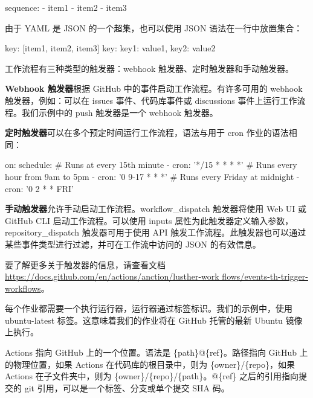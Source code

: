\begin{shell}
sequence:
  - item1
  - item2
  - item3
\end{shell}

由于 YAML 是 JSON 的一个超集，也可以使用 JSON 语法在一行中放置集合：

\begin{shell}
key: [item1, item2, item3]
key: {key1: value1, key2: value2}
\end{shell}


工作流程有三种类型的触发器：webhook 触发器、定时触发器和手动触发器。

\textbf{Webhook 触发器}根据 GitHub 中的事件启动工作流程。有许多可用的 webhook 触发器，例如：可以在 issues 事件、代码库事件或 discussions 事件上运行工作流程。我们示例中的 push 触发器是一个 webhook 触发器。

\textbf{定时触发器}可以在多个预定时间运行工作流程，语法与用于 cron 作业的语法相同：

\begin{shell}
on:
  schedule:
    # Runs at every 15th minute
    - cron: '*/15 * * * *'
    # Runs every hour from 9am to 5pm
    - cron: '0 9-17 * * *'
    # Runs every Friday at midnight
    - cron: '0 2 * * FRI'
\end{shell}

\textbf{手动触发器}允许手动启动工作流程。workflow\_dispatch 触发器将使用 Web UI 或 GitHub CLI 启动工作流程。可以使用 inputs 属性为此触发器定义输入参数，repository\_dispatch 触发器可用于使用 API 触发工作流程。此触发器也可以通过某些事件类型进行过滤，并可在工作流中访问的 JSON 的有效信息。

要了解更多关于触发器的信息，请查看文档\url{https://docs.github.com/en/actions/anction/lusther-work flows/events-th-trigger-workflows}。


每个作业都需要一个执行运行器，运行器通过标签标识。我们的示例中，使用 ubuntu-latest 标签。这意味着我们的作业将在 GitHub 托管的最新 Ubuntu 镜像上执行。


Actions 指向 GitHub 上的一个位置。语法是 \{path\}@\{ref\}。路径指向 GitHub 上的物理位置，如果 Actions 在代码库的根目录中，则为 \{owner\}/\{repo\}，如果 Actions 在子文件夹中，则为 \{owner\}/\{repo\}/\{path\}。@\{ref\} 之后的引用指向提交的 git 引用，可以是一个标签、分支或单个提交 SHA 码。

